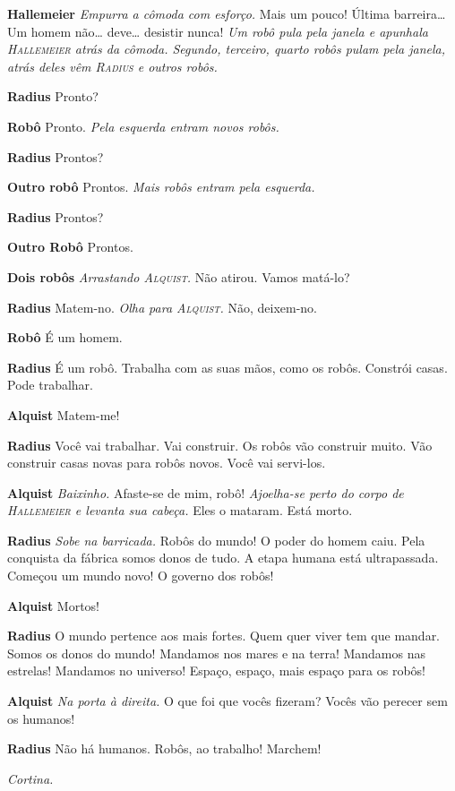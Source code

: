 \textbf{Hallemeier} \emph{Empurra a cômoda com esforço.} Mais um pouco! Última
barreira\ldots{} Um homem não\ldots{} deve\ldots{} desistir nunca!
\emph{Um robô pula pela janela e apunhala \textsc{Hallemeier} atrás da cômoda. Segundo,
terceiro, quarto robôs pulam pela janela, atrás deles vêm \textsc{Radius} e outros
robôs.}

\textbf{Radius} Pronto?

\textbf{Robô} Pronto.
\emph{Pela esquerda entram novos robôs.}

\textbf{Radius} Prontos?

\textbf{Outro robô} Prontos.
\emph{Mais robôs entram pela esquerda.}

\textbf{Radius} Prontos?

\textbf{Outro Robô} Prontos.

\textbf{Dois robôs} \emph{Arrastando \textsc{Alquist}.} Não atirou. Vamos matá-lo?

\textbf{Radius} Matem-no. \emph{Olha para \textsc{Alquist}.} Não, deixem-no.

\textbf{Robô} É um homem.

\textbf{Radius} É um robô. Trabalha com as suas mãos, como os robôs. Constrói casas.
Pode trabalhar.

\textbf{Alquist} Matem-me!

\textbf{Radius} Você vai trabalhar. Vai construir. Os robôs vão construir muito. Vão
construir casas novas para robôs novos. Você vai servi-los.

\textbf{Alquist} \emph{Baixinho.} Afaste-se de mim, robô! \emph{Ajoelha-se perto do
corpo de \textsc{Hallemeier} e levanta sua cabeça.} Eles o mataram. Está morto.

\textbf{Radius} \emph{Sobe na barricada.} Robôs do mundo! O poder do homem caiu. Pela
conquista da fábrica somos donos de tudo. A etapa humana está ultrapassada.
Começou um mundo novo! O governo dos robôs!

\textbf{Alquist} Mortos!

\textbf{Radius} O mundo pertence aos mais fortes. Quem quer viver tem que mandar. Somos
os donos do mundo! Mandamos nos mares e na terra! Mandamos nas estrelas!
Mandamos no universo! Espaço, espaço, mais espaço para os robôs!

\textbf{Alquist} \emph{Na porta à direita.} O que foi que vocês fizeram? Vocês vão
perecer sem os humanos!

\textbf{Radius} Não há humanos. Robôs, ao trabalho! Marchem!

\emph{Cortina.}



